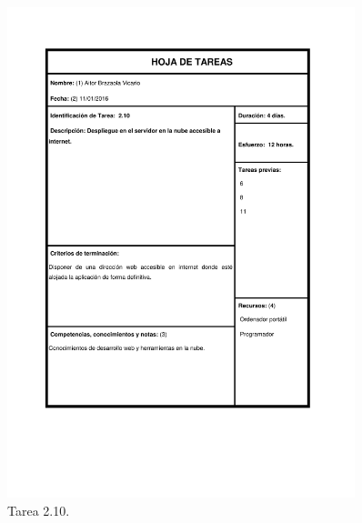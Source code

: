 \documentclass{DeustoFDP}
\begin{document}
\begin{figure}[H]
    \centering
    \includegraphics[width=0.9\textwidth]{fig/Tareas/210}
    \caption{Tarea 2.10.}
    \label{fig:t210}
\end{figure}
\end{document}
